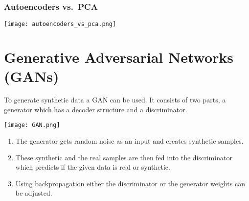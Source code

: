 \subsubsection{Autoencoders vs.\ PCA}
\begin{center}
    \texttt{[image: autoencoders\_vs\_pca.png]}
\end{center}

\section{Generative Adversarial Networks (GANs)}

To generate synthetic data a GAN can be used. It consists of two parts, a generator which has a decoder structure and a discriminator. 
\begin{center}
    \texttt{[image: GAN.png]}
\end{center}
\begin{enumerate}
    \item The generator gets random noise as an input and creates synthetic samples.
    \item These synthetic and the real samples are then fed into the discriminator which predicts if the given data is real or synthetic.
    \item Using backpropagation either the discriminator or the generator weights can be adjusted.
\end{enumerate}
